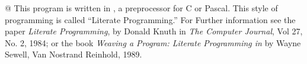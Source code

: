 @ This program is written in \web, a preprocessor for C or Pascal.
This style of programming is called ``Literate Programming.''  For Further
information see the paper {\it Literate Programming}, by Donald Knuth in
{\sl The Computer Journal}, Vol 27, No. 2, 1984; or the book 
{\sl Weaving a Program: Literate Programming
in \web\/} by Wayne Sewell, Van Nostrand Reinhold, 1989.

